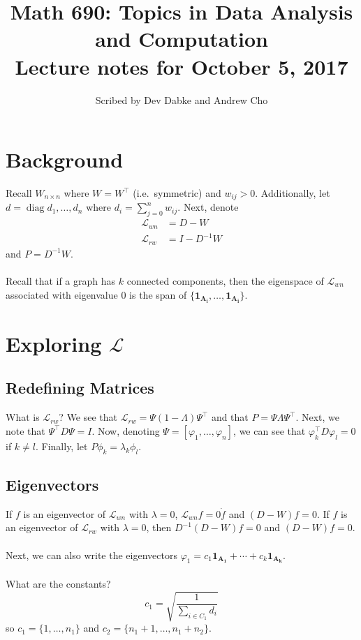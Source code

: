 \documentclass[12pt]{article}
\title{Math 690: Topics in Data Analysis and Computation \\
Lecture notes for October 5, 2017}
\date{}
\author{Scribed by Dev Dabke and Andrew Cho}
\theoremstyle{plain}
\DeclareMathOperator*{\diag}{diag}
\begin{document}
\maketitle

\section{Background}

Recall $ W_{n \times n} $ where $ W = W^{\intercal} $ (i.e.\ symmetric) and $ w_{ij} > 0 $.
Additionally, let $ d = \diag{d_1, \ldots, d_n} $ where $ d_i = \sum_{j = 0}^{n} w_{ij} $.
Next, denote
\begin{align*}
  \mathcal{L}_{wn} &= D - W \\
  \mathcal{L}_{rw} &= I - D^{-1} W
\end{align*}
and $ P = D^{-1} W $.
\\ \\
Recall that if a graph has $ k $ connected components, then the eigenspace of $ \mathcal{L}_{wn} $ associated with eigenvalue $ 0 $ is the span of $ \{ \mathbf{1_{A_{i}}}, \ldots, \mathbf{1_{A_{i}}} \} $.

\section{Exploring $ \mathcal{L} $}

\subsection{Redefining Matrices}

What is $ \mathcal{L}_{rw} $?
We see that $ \mathcal{L}_{rw} = \Psi(1 - \Lambda)\Psi^{\intercal} $ and that $ P = \Psi\Lambda\Psi^{\intercal} $.
Next, we note that $ \Psi^{\intercal} D \Psi = I $.
Now, denoting $ \Psi = [ \varphi_1, \ldots, \varphi_{n} ] $, we can see that $ \varphi_k^{\intercal} D \varphi_l = 0 $ if $ k \neq l $.
Finally, let $ P \phi_k = \lambda_k \phi_l $.

\subsection{Eigenvectors}

If $ f $ is an eigenvector of $ \mathcal{L}_{wn} $ with $ \lambda = 0 $, $ \mathcal{L}_{wn} f = 0 \dot f $ and $ (D - W)f = 0 $.
If $ f $ is an eigenvector of $ \mathcal{L}_{rw} $ with $ \lambda = 0 $, then $ D^{-1} (D - W) f = 0 $ and $ (D - W)f = 0 $.
\\ \\
Next, we can also write the eigenvectors $ \varphi_{1} = c_1 \mathbf{1_{A_{1}}} + \cdots + c_k \mathbf{1_{A_{k}}} $.
\\ \\
What are the constants?
\[
c_1 = \sqrt{\frac{1}{\sum_{i \in C_1}d_i}}
\]
so $ c_1 = \{ 1, \ldots, n_1 \} $ and $ c_2 = \{ n_1 + 1, \ldots, n_1 + n_2 \} $.
\end{document}
